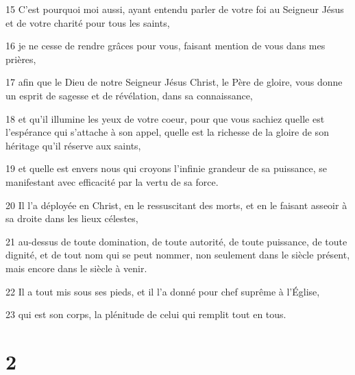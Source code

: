 \par 15 C'est pourquoi moi aussi, ayant entendu parler de votre foi au Seigneur Jésus et de votre charité pour tous les saints,
\par 16 je ne cesse de rendre grâces pour vous, faisant mention de vous dans mes prières,
\par 17 afin que le Dieu de notre Seigneur Jésus Christ, le Père de gloire, vous donne un esprit de sagesse et de révélation, dans sa connaissance,
\par 18 et qu'il illumine les yeux de votre coeur, pour que vous sachiez quelle est l'espérance qui s'attache à son appel, quelle est la richesse de la gloire de son héritage qu'il réserve aux saints,
\par 19 et quelle est envers nous qui croyons l'infinie grandeur de sa puissance, se manifestant avec efficacité par la vertu de sa force.
\par 20 Il l'a déployée en Christ, en le ressuscitant des morts, et en le faisant asseoir à sa droite dans les lieux célestes,
\par 21 au-dessus de toute domination, de toute autorité, de toute puissance, de toute dignité, et de tout nom qui se peut nommer, non seulement dans le siècle présent, mais encore dans le siècle à venir.
\par 22 Il a tout mis sous ses pieds, et il l'a donné pour chef suprême à l'Église,
\par 23 qui est son corps, la plénitude de celui qui remplit tout en tous.

\chapter{2}

